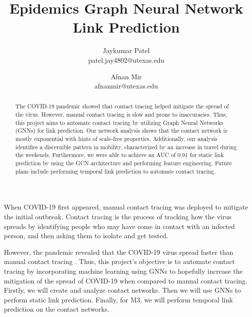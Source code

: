 \documentclass[times, 10pt,twocolumn]{article}
\begin{document}
\title{Epidemics Graph Neural Network Link Prediction}

\author{Jaykumar Patel\\
patel.jay4802@utexas.edu\\
\and
Afnan Mir\\
afnanmir@utexas.edu\\
}

\maketitle
\thispagestyle{empty}

\begin{abstract}
The COVID-19 pandemic showed that contact tracing helped mitigate the spread of the virus. However, manual contact tracing is slow and prone to inaccuracies. Thus, this project aims to automate contact tracing by utilizing Graph Neural Networks (GNNs) for link prediction. Our network analysis shows that the contact network is mostly exponential with hints of scale-free properties. Additionally, our analysis identifies a discernible pattern in mobility, characterized by an increase in travel during the weekends. Furthermore, we were able to achieve an AUC of 0.91 for static link prediction by using the GCN architecture and performing feature engineering. Future plans include performing temporal link prediction to automate contact tracing.
\end{abstract}



When COVID-19 first appeared, manual contact tracing was deployed to mitigate the initial outbreak. Contact tracing is the process of tracking how the virus spreads by identifying people who may have come in contact with an infected person, and then asking them to isolate and get tested.

However, the pandemic revealed that the COVID-19 virus spread faster than manual contact tracing \cite{flaxman2020estimating}. Thus, this project's objective is to automate contact tracing by incorporating machine learning using GNNs to hopefully increase the mitigation of the spread of COVID-19 when compared to manual contact tracing. Firstly, we will create and analyze contact networks. Then we will use GNNs to perform static link prediction. Finally, for M3, we will perform temporal link prediction on the contact networks.
\end{document}
